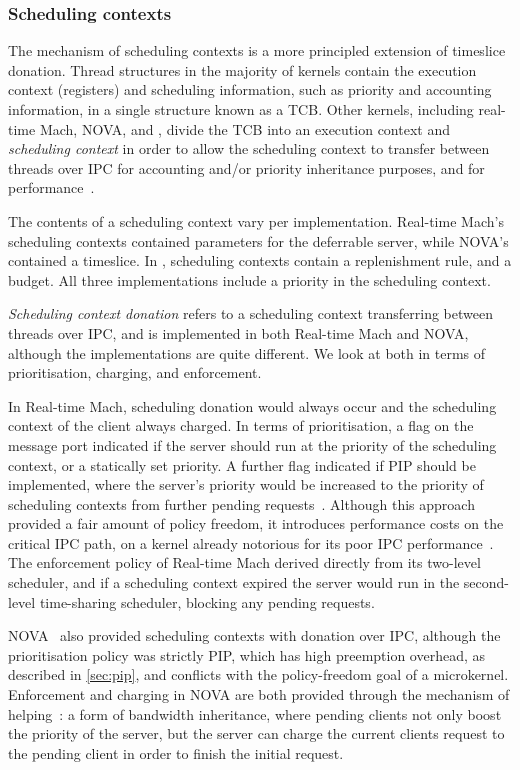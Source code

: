 \subsubsection{Scheduling contexts}
\label{s:sc-intro}

The mechanism of scheduling contexts is a more principled extension of timeslice donation.
Thread structures in the majority of kernels contain the execution context (registers) and scheduling
information, such as priority and accounting information, in a single structure known as a \gls{TCB}.
Other kernels, including real-time Mach, NOVA, and \fiascooc, divide the TCB into an execution context and
\emph{scheduling context} in order to allow the scheduling context to
transfer between threads over \gls{IPC} for accounting and/or priority inheritance purposes, and for
performance~\citep{Steinberg_WH_05}.

The contents of a scheduling context vary per implementation.
Real-time Mach's scheduling contexts contained parameters for the deferrable
server, while NOVA's contained a timeslice. In \fiascooc, scheduling contexts contain a
replenishment rule, and a budget. All three implementations include a priority in the
scheduling context. 

\emph{Scheduling context donation} refers to a scheduling context transferring between threads over
\gls{IPC}, and is implemented in both Real-time Mach and NOVA, although the implementations are
quite different. We look at both in terms of prioritisation, charging, and enforcement. 

In Real-time Mach, scheduling donation would always occur and the scheduling context of the client
always charged. In terms of prioritisation, a flag on the message port
indicated if the server should run at the priority of the scheduling context, or a statically set
priority. A further flag indicated if \gls{PIP} should be implemented, where the server's priority
would be increased to the priority of scheduling contexts from further pending requests~\citep{Kitayama_NT_93}. Although this approach provided a fair amount of policy freedom, it introduces performance costs on the 
critical \gls{IPC} path, on a kernel already notorious for its poor \gls{IPC}
performance~\citep{Hartig_HLSW_97}. 
The enforcement policy of Real-time Mach derived directly from its two-level scheduler, and if a
scheduling context expired the server would run in the second-level time-sharing scheduler, blocking
any pending requests.

NOVA~\citep{Steinberg_Kauer_10} also provided scheduling contexts with donation over \gls{IPC},
although the prioritisation policy was strictly \gls{PIP}, which has high preemption overhead, 
as described in \cref{sec:pip}, and conflicts with the
policy-freedom goal of a microkernel. 
Enforcement and charging
in NOVA are both provided through the mechanism of helping~\citep{Steinberg_BK_10}:  a form of
bandwidth inheritance, where pending clients not only boost the priority of the server, but the
server can charge the current clients request to the pending client in order to finish the initial request. 

